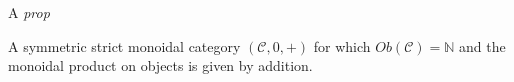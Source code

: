 
A \emph{prop}

A symmetric strict monoidal category $(\mathcal{C}, 0,+)$ for which $Ob(\mathcal{C})=\mathbb{N}$ and the monoidal product on objects is given by addition.
